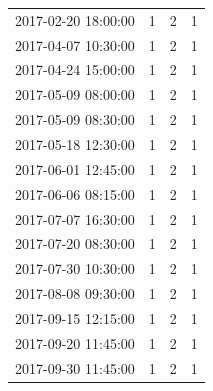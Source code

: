 \begin{tabular}{lrrr}
2017-02-20 18:00:00 & 1 & 2 & 1 \\
2017-04-07 10:30:00 & 1 & 2 & 1 \\
2017-04-24 15:00:00 & 1 & 2 & 1 \\
2017-05-09 08:00:00 & 1 & 2 & 1 \\
2017-05-09 08:30:00 & 1 & 2 & 1 \\
2017-05-18 12:30:00 & 1 & 2 & 1 \\
2017-06-01 12:45:00 & 1 & 2 & 1 \\
2017-06-06 08:15:00 & 1 & 2 & 1 \\
2017-07-07 16:30:00 & 1 & 2 & 1 \\
2017-07-20 08:30:00 & 1 & 2 & 1 \\
2017-07-30 10:30:00 & 1 & 2 & 1 \\
2017-08-08 09:30:00 & 1 & 2 & 1 \\
2017-09-15 12:15:00 & 1 & 2 & 1 \\
2017-09-20 11:45:00 & 1 & 2 & 1 \\
2017-09-30 11:45:00 & 1 & 2 & 1 \\
\bottomrule
\end{tabular}
